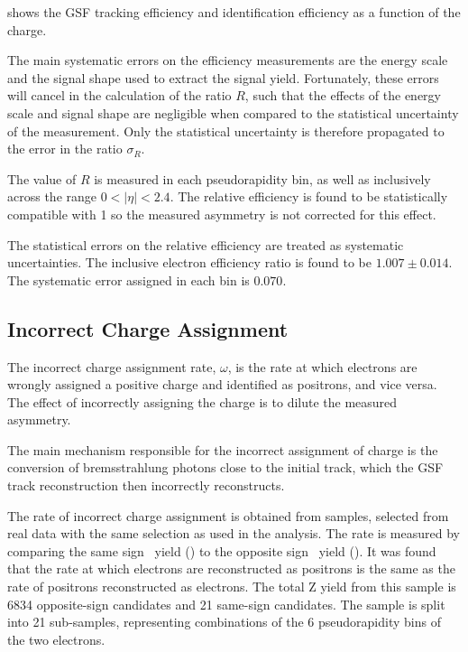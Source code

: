  shows the GSF tracking efficiency and identification 
efficiency as a function of the charge.

The main systematic errors on the efficiency measurements are the energy scale
and the signal shape used to extract the signal yield. Fortunately, these
errors will cancel in the calculation of the ratio $R$, such that the
effects of the energy scale and signal shape are negligible
when compared to the statistical uncertainty of the measurement. Only the
statistical uncertainty is therefore propagated to the error in the ratio
$\sigma_R$.

The value of $R$ is measured in each pseudorapidity bin, as well as inclusively
across the range $0<| \eta |< 2.4$. 
The relative efficiency is found to be statistically compatible with 1 so the
measured asymmetry is not corrected for this effect.

The statistical errors on the relative efficiency are treated as systematic
uncertainties. The inclusive electron efficiency ratio is found to be
$1.007\pm0.014$.  The systematic error assigned in each bin is $0.070$.

\subsection{Incorrect Charge Assignment}

The incorrect charge assignment rate, $\omega$, is the rate at which electrons are
wrongly assigned a positive charge and identified as positrons, and vice versa.
The effect of incorrectly assigning the charge is to dilute the measured
asymmetry.

The main mechanism responsible for the incorrect assignment of charge is the
conversion of bremsstrahlung photons close to the initial track, which the GSF
track reconstruction then incorrectly reconstructs.

The rate of incorrect charge assignment is obtained from \Zee samples, selected from
real data with the same selection as used in the analysis. 
The rate is measured by comparing the
same sign \PZ\ yield (\HepProcess{\PZ\to\Pepm\Pepm}) to the opposite sign \PZ\
yield (\HepProcess{\PZ\to\Pelectron\APelectron}).
It was found that the rate at which electrons are reconstructed as positrons is
the same as the rate of positrons reconstructed as electrons.
The total Z yield from this sample is 6834 opposite-sign \PZ candidates and 21
same-sign \PZ candidates.
The sample is split into 21 sub-samples, representing
combinations of the 6 pseudorapidity bins of the two electrons.

